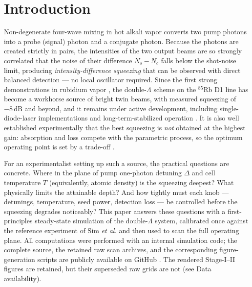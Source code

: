 \documentclass[11pt,a4paper]{article}
\newcommand{\dB}{\,\mathrm{dB}}
\newcommand{\Rb}{$^{85}$Rb}
\begin{document}
\tableofcontents
\bigskip

\section{Introduction}
Non-degenerate four-wave mixing in hot alkali vapor converts two pump photons
into a probe (signal) photon and a conjugate photon. Because the photons are
created strictly in pairs, the intensities of the two output beams are so
strongly correlated that the noise of their difference $N_s-N_c$ falls below
the shot-noise limit, producing \emph{intensity-difference squeezing} that
can be observed with direct balanced detection --- no local oscillator
required. Since the first strong
demonstrations in rubidium vapor \cite{McCormick2007,Pooser2009}, the
double-$\Lambda$ scheme on the \Rb{} D1 line has become a workhorse source of
bright twin beams, with measured squeezing of $-8\dB$ and beyond, and it
remains under active development, including single-diode-laser
implementations \cite{Sim2025} and long-term-stabilized operation
\cite{Allen2026}. It is also well established experimentally that the
best squeezing is \emph{not} obtained at the highest gain: absorption and
loss compete with the parametric process, so the optimum operating point is
set by a trade-off \cite{Jasperse2011}.

For an experimentalist setting up such a source, the practical questions are
concrete. Where in the plane of pump one-photon detuning $\Delta$ and cell
temperature $T$ (equivalently, atomic density) is the squeezing deepest? What
physically limits the attainable depth? And how tightly must each knob ---
detunings, temperature, seed power, detection loss --- be controlled before
the squeezing degrades noticeably? This paper answers these questions with a
first-principles steady-state simulation of the double-$\Lambda$ system,
calibrated once against the reference experiment of Sim \emph{et al.}
\cite{Sim2025} and then used to scan the full operating plane. All
computations were performed with an internal simulation code; the complete
source, the retained raw scan archives, and the corresponding figure-generation
scripts are publicly available on GitHub \cite{repo}. The rendered Stage-I--II
figures are retained, but their superseded raw grids are not (see Data
availability).
\end{document}
